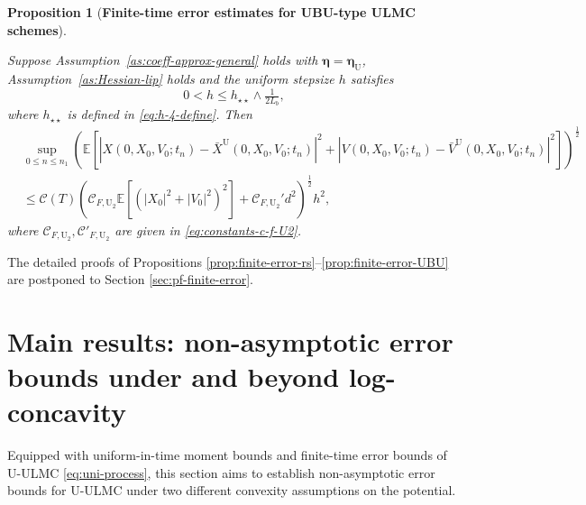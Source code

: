 \documentclass[12pt]{article}
\newenvironment{redtext}
  {\color{black}\ignorespaces}
  {\ignorespacesafterend}
\numberwithin{equation}{section}
\newtheorem{prop}{Proposition}[section]
\begin{document}
\begin{redtext}
\begin{prop}[\textbf{Finite-time error estimates for UBU-type ULMC schemes}]
\begin{enumerate}
Suppose
Assumption~\ref{as:coeff-approx-general} holds with
$\boldsymbol{\eta}=\boldsymbol{\eta}_{\mathrm U}$, Assumption~\ref{as:Hessian-lip} holds and the
uniform stepsize $h$ satisfies
\begin{equation}
\label{eq:final-condition-of-stepsize-UBU-second-order}
0<h\leq h_{\star\star}\wedge\tfrac{1}{2L_b},
\end{equation}
where $h_{\star\star}$ is defined in
\eqref{eq:h-4-define}. Then
\begin{equation}
\label{eq:sup-second-moment-error-finite-time-UBU-hl}
\begin{aligned}
&
\sup_{0\leq n\leq n_1}
\left(
\mathbb E
\left[
\left|
X(0,X_0,V_0;t_n)
-
\bar X^{\mathrm{U}}(0,X_0,V_0;t_n)
\right|^2
+
\left|
V(0,X_0,V_0;t_n)
-
\bar V^{\mathrm{U}}(0,X_0,V_0;t_n)
\right|^2
\right]
\right)^{\frac12}
\\
&\leq
\mathcal C(T)
\left(
\mathcal C_{F,\mathrm{U}_2}
\mathbb E
\left[
\left(
|X_0|^2+|V_0|^2
\right)^2
\right]
+
\mathcal C_{F,\mathrm{U}_2}'d^2
\right)^{\frac12}
h^2,
\end{aligned}
\end{equation}
where $\mathcal C_{F,\mathrm{U}_2}, \mathcal C'_{F,\mathrm{U}_2}$ are given in \eqref{eq:constants-c-f-U2}.
\end{enumerate}
\end{prop}    
\end{redtext}

The detailed proofs of Propositions \ref{prop:finite-error-rs}--\ref{prop:finite-error-UBU} are postponed to Section \ref{sec:pf-finite-error}.








\section{Main results: non-asymptotic error bounds under and beyond log-concavity} \label{sec:non-asym-error-bounds}

Equipped with uniform-in-time moment bounds and finite-time error bounds of U-ULMC \eqref{eq:uni-process},
this section aims to establish non-asymptotic error bounds for U-ULMC under two different convexity assumptions on the potential.
% 
\end{document}
